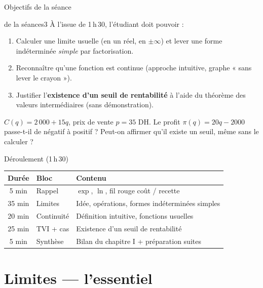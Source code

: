 \documentclass[10pt,aspectratio=169]{beamer}
\numberwithin{dummy}{section}
\newcommand{\CT}{C}
\newcommand{\Prof}{\pi}
\begin{document}
\begin{frame}{Objectifs de la séance}
\begin{myobj}{de la séance}{s3}
À l'issue de 1\,h\,30, l'étudiant doit pouvoir :
\end{myobj}
\vspace{-0.4em}
\begin{enumerate}
    \item Calculer une limite usuelle (en un réel, en $\pm\infty$) et lever une forme indéterminée \emph{simple} par factorisation.
    \item Reconnaître qu'une fonction est continue (approche intuitive, graphe « sans lever le crayon »).
    \item Justifier l'\textbf{existence d'un seuil de rentabilité} à l'aide du théorème des valeurs intermédiaires (sans démonstration).
\end{enumerate}

\vspace{0.3em}
\begin{boxgestion}
$\CT(q)=2\,000+15q$, prix de vente $p=35$ DH.
Le profit $\Prof(q)=20q-2000$ passe-t-il de négatif à positif ?
Peut-on affirmer qu'il existe un seuil, même sans le calculer ?
\end{boxgestion}
\end{frame}

\begin{frame}{Déroulement (1\,h\,30)}
\renewcommand{\arraystretch}{1.35}
\begin{center}
\begin{tabular}{@{}clp{7.8cm}@{}}
\toprule
\textbf{Durée} & \textbf{Bloc} & \textbf{Contenu} \\
\midrule
5 min  & Rappel & $\exp$, $\ln$, fil rouge coût / recette \\
35 min & Limites & Idée, opérations, formes indéterminées simples \\
20 min & Continuité & Définition intuitive, fonctions usuelles \\
25 min & TVI + cas & Existence d'un seuil de rentabilité \\
5 min  & Synthèse & Bilan du chapitre I + préparation suites \\
\bottomrule
\end{tabular}
\end{center}
\end{frame}


\section{Limites --- l'essentiel}
\end{document}
